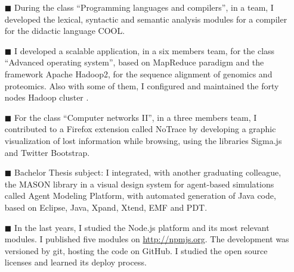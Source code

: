 \documentclass[helvetica,english,logo,notitle,totpages,utf8]{europecv2013}
\begin{document}
\begin{europecv}
{\begin{itemize}
	\item[\color{curious-blue}\tiny$\blacksquare$] During the class “Programming languages and compilers”, in a team, I developed the lexical, syntactic and semantic analysis modules for a compiler for the didactic language COOL.
	\item[\color{curious-blue}\tiny$\blacksquare$] I developed a scalable application, in a six members team, for the class “Advanced operating system”, based on MapReduce paradigm and the framework Apache Hadoop2, for the sequence alignment of genomics and proteomics. Also with some of them, I configured and maintained the forty nodes Hadoop cluster .
	\item[\color{curious-blue}\tiny$\blacksquare$] For the class “Computer networks II”, in a three members team, I contributed to a Firefox extension called NoTrace by developing a graphic visualization of lost information while browsing, using the libraries Sigma.js and Twitter Bootstrap.
	\item[\color{curious-blue}\tiny$\blacksquare$] Bachelor Thesis subject: I integrated, with another graduating colleague, the MASON library in a visual design system for agent-based simulations called Agent Modeling Platform, with automated generation of Java code, based on Eclipse, Java, Xpand, Xtend, EMF and PDT.
	\item[\color{curious-blue}\tiny$\blacksquare$] In the last years, I studied the Node.js platform and its most relevant modules. I published five modules on \url{http://npmjs.org}. The development was versioned by git, hosting the code on GitHub. I studied the open source licenses and learned its deploy process.
\end{itemize}
}








\end{europecv}
\end{document}
